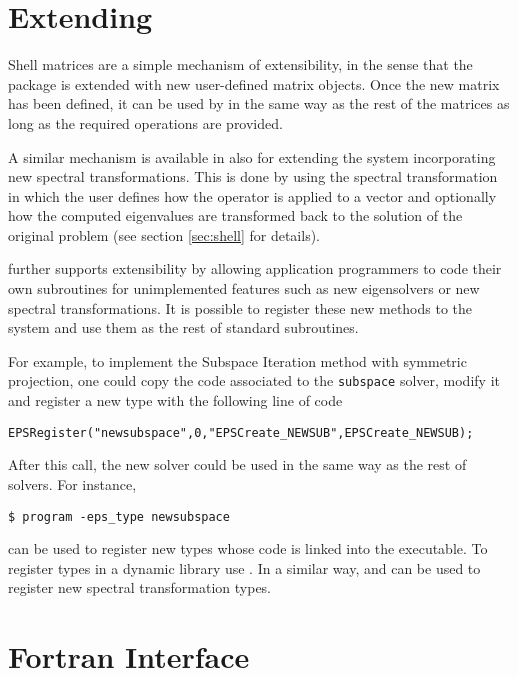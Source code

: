 \section{Extending \slepc}
\label{sec:extend}

	Shell matrices are a simple mechanism of extensibility, in the sense that the package is extended with new user-defined matrix objects. Once the new matrix has been defined, it can be used by \slepc in the same way as the rest of the matrices as long as the required operations are provided.

	A similar mechanism is available in \slepc also for extending the system incorporating new spectral transformations. This is done by using the  spectral transformation in which the user defines how the operator is applied to a vector and optionally how the computed eigenvalues are transformed back to the solution of the original problem (see section \ref{sec:shell} for details).

	\slepc further supports extensibility by allowing application programmers to code their own subroutines for unimplemented features such as new eigensolvers or new spectral transformations. It is possible to register these new methods to the system and use them as the rest of standard subroutines.

	For example, to implement the Subspace Iteration method with symmetric projection, one could copy the \slepc code associated to the \texttt{subspace} solver, modify it and register a new  type with the following line of code
	\begin{Verbatim}[fontsize=\small]
	EPSRegister("newsubspace",0,"EPSCreate_NEWSUB",EPSCreate_NEWSUB);
	\end{Verbatim}
After this call, the new solver could be used in the same way as the rest of \slepc solvers. For instance,
	\begin{Verbatim}[fontsize=\small]
	$ program -eps_type newsubspace
	\end{Verbatim}

	 can be used to register new types whose code is linked into the executable. To register types in a dynamic library use .
	In a similar way,  and  can be used to register new spectral transformation types.

\section{Fortran Interface}
\label{sec:fortran}

